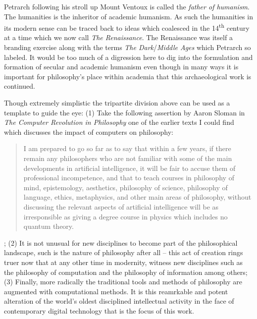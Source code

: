 \documentclass[dah,phd,a4paper]{xe_uccthesis}
\newcommand{\work}[1] {\textit{#1}}
\begin{document}
Petrarch following his stroll up Mount Ventoux\citep{petrarca_petrarchs_2006} is called the \emph{father of humanism}. The humanities is the inheritor of academic humanism. As such the humanities in its modern sense can be traced back to ideas which coalesced in the 14\textsuperscript{th} century at a time which we now call \emph{The Renaissance}. The Renaissance was itself a branding exercise along with the terms \emph{The Dark}/\emph{Middle Ages} which Petrarch so labeled. It would be too much of a digression here to dig into the formulation and formation of secular and academic humanism even though in many ways it is important for philosophy's place within academia that this archaeological\cite{heidegger_letter_2010} work is continued.

Though extremely simplistic the tripartite division above can be used as a template to guide the eye: (1) Take the following assertion by Aaron Sloman in \work{The Computer Revolution in Philosophy}\cite{sloman_computer_1978} one of the earlier texts I could find which discusses the impact of computers on philosophy:
\begin{quotation}
I am prepared to go so far as to say that within a few years, if there remain any philosophers who are not familiar with some of the main developments in artificial intelligence, it will be fair to accuse them of professional incompetence, and that to teach courses in philosophy of mind, epistemology, aesthetics, philosophy of science, philosophy of language, ethics, metaphysics, and other main areas of philosophy, without discussing the relevant aspects of artificial intelligence will be as irresponsible as giving a degree course in physics which includes no quantum theory.
\begin{flushright}
\citep[See][XX]{sloman_computer_1978}
\end{flushright}
\end{quotation};
(2) It is not unusual for new disciplines to become part of the philosophical landscape, such is the nature of philosophy after all -- this act of creation rings truer now that at any other time in modernity, witness new disciplines such as the philosophy of computation and the philosophy of information among others;
(3) Finally, more radically the traditional tools and methods of philosophy are augmented with computational methods. It is this reamrkable and potent alteration of the world's oldest disciplined intellectual activity in the face of contemporary digital technology that is the focus of this work.
\end{document}
